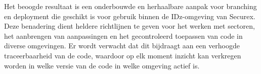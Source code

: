 

Het beoogde resultaat is een onderbouwde en herhaalbare aanpak voor branching en deployment die geschikt is voor gebruik binnen de IDz-omgeving van Securex. Deze benadering dient heldere richtlijnen te geven voor het werken met sectoren, het aanbrengen van aanpassingen en het gecontroleerd toepassen van code in diverse omgevingen. Er wordt verwacht dat dit bijdraagt aan een verhoogde traceerbaarheid van de code, waardoor op elk moment inzicht kan verkregen worden in welke versie van de code in welke omgeving actief is.











